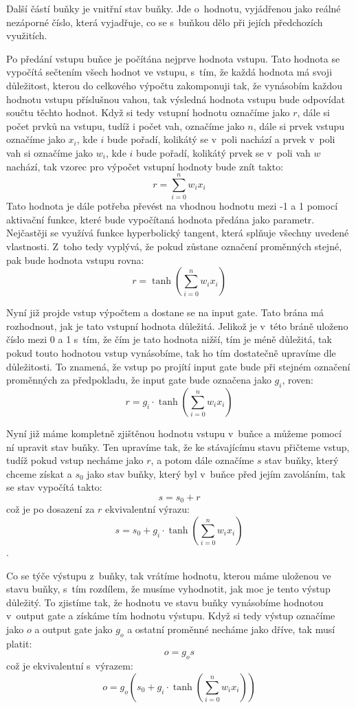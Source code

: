 \documentclass[a4paper]{article}
\begin{document}
\clearpage
Další částí buňky je vnitřní stav buňky. Jde o~hodnotu, vyjádřenou jako reálné nezáporné číslo, která vyjadřuje, co se s~buňkou dělo při jejích předchozích využitích.\par
Po předání vstupu buňce je počítána nejprve hodnota vstupu. Tato hodnota se vypočítá sečtením všech hodnot ve vstupu, s~tím, že každá hodnota má svoji důležitost, kterou do celkového výpočtu zakomponuji tak, že vynásobím každou hodnotu vstupu příslušnou vahou, tak výsledná hodnota vstupu bude odpovídat součtu těchto hodnot. Když si tedy vstupní hodnotu označíme jako $r$, dále si počet prvků na vstupu, tudíž i počet vah, označíme jako $n$, dále si prvek vstupu označíme jako $x_i$, kde $i$ bude pořadí, kolikátý se v~poli nachází a prvek v~poli vah si označíme jako $w_i$, kde $i$ bude pořadí, kolikátý prvek se v~poli vah $w$ nachází, tak vzorec pro výpočet vstupní hodnoty bude znít takto:$$r = \sum\limits_{i=0}^n w_ix_i$$
Tato hodnota je dále potřeba převést na vhodnou hodnotu mezi -1 a 1 pomocí aktivační funkce, které bude vypočítaná hodnota předána jako parametr. Nejčastěji se využívá funkce hyperbolický tangent, která splňuje všechny uvedené vlastnosti. Z~toho tedy vyplývá, že pokud zůstane označení proměnných stejné, pak bude hodnota vstupu rovna: $$r = \tanh(\sum\limits_{i=0}^n w_ix_i)$$\par
Nyní již projde vstup výpočtem a dostane se na input gate. Tato brána má rozhodnout, jak je tato vstupní hodnota důležitá. Jelikož je v~této bráně uloženo číslo mezi 0 a 1 s~tím, že čím je tato hodnota nižší, tím je méně důležitá, tak pokud touto hodnotou vstup vynásobíme, tak ho tím dostatečně upravíme dle důležitosti. To znamená, že vstup po projítí input gate bude při stejném označení proměnných za předpokladu, že input gate bude označena jako $g_i$, roven: $$r = g_i\cdot\tanh(\sum\limits_{i=0}^n w_ix_i)$$\par
Nyní již máme kompletně zjištěnou hodnotu vstupu v~buňce a můžeme pomocí ní upravit stav buňky. Ten upravíme tak, že ke stávajícímu stavu přičteme vstup, tudíž pokud vstup necháme jako $r$, a potom dále označíme $s$ stav buňky, který chceme získat a $s_0$ jako stav buňky, který byl v~buňce před jejím zavoláním, tak se stav vypočítá takto: $$s = s_0 + r$$což je po dosazení za $r$ ekvivalentní výrazu: $$s = s_0 + g_i\cdot\tanh(\sum\limits_{i=0}^n w_ix_i)$$.\par
Co se týče výstupu z~buňky, tak vrátíme hodnotu, kterou máme uloženou ve stavu buňky, s~tím rozdílem, že musíme vyhodnotit, jak moc je tento výstup důležitý. To zjistíme tak, že hodnotu ve stavu buňky vynásobíme hodnotou v~output gate a získáme tím hodnotu výstupu. Když si tedy výstup označíme jako $o$ a output gate jako $g_o$ a ostatní proměnné necháme jako dříve, tak musí platit: $$o = g_os$$ což je ekvivalentní s~výrazem: $$o = g_o(s_0 + g_i\cdot\tanh(\sum\limits_{i=0}^n w_ix_i))$$\par
\end{document}
